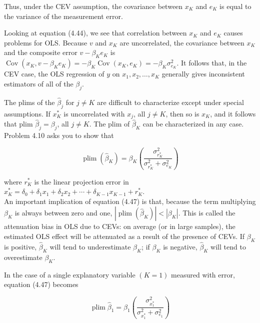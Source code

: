 \documentclass[10pt]{article}
\begin{document}
Thus, under the CEV assumption, the covariance between $x_{K}$ and $e_{K}$ is equal to the variance of the measurement error.

Looking at equation (4.44), we see that correlation between $x_{K}$ and $e_{K}$ causes problems for OLS. Because $v$ and $x_{K}$ are uncorrelated, the covariance between $x_{K}$ and the composite error $v-\beta_{K} e_{K}$ is $\operatorname{Cov}\left(x_{K}, v-\beta_{K} e_{K}\right)=-\beta_{K} \operatorname{Cov}\left(x_{K}, e_{K}\right)= -\beta_{K} \sigma_{e_{K}}^{2}$. It follows that, in the CEV case, the OLS regression of $y$ on $x_{1}, x_{2}, \ldots, x_{K}$ generally gives inconsistent estimators of all of the $\beta_{j}$.

The plims of the $\hat{\beta}_{j}$ for $j \neq K$ are difficult to characterize except under special assumptions. If $x_{K}^{*}$ is uncorrelated with $x_{j}$, all $j \neq K$, then so is $x_{K}$, and it follows that plim $\hat{\beta}_{j}=\beta_{j}$, all $j \neq K$. The plim of $\hat{\beta}_{K}$ can be characterized in any case. Problem 4.10 asks you to show that


\begin{equation*}
\operatorname{plim}\left(\hat{\beta}_{K}\right)=\beta_{K}\left(\frac{\sigma_{r_{K}^{*}}^{2}}{\sigma_{r_{K}^{*}}^{2}+\sigma_{e_{K}}^{2}}\right) \tag{4.47}
\end{equation*}


where $r_{K}^{*}$ is the linear projection error in\\
$x_{K}^{*}=\delta_{0}+\delta_{1} x_{1}+\delta_{2} x_{2}+\cdots+\delta_{K-1} x_{K-1}+r_{K}^{*}$.\\
An important implication of equation (4.47) is that, because the term multiplying $\beta_{K}$ is always between zero and one, $\left|\operatorname{plim}\left(\hat{\beta}_{K}\right)\right|<\left|\beta_{K}\right|$. This is called the attenuation bias in OLS due to CEVs: on average (or in large samples), the estimated OLS effect will be attenuated as a result of the presence of CEVs. If $\beta_{K}$ is positive, $\hat{\beta}_{K}$ will tend to underestimate $\beta_{K}$; if $\beta_{K}$ is negative, $\hat{\beta}_{K}$ will tend to overestimate $\beta_{K}$.

In the case of a single explanatory variable $(K=1)$ measured with error, equation (4.47) becomes


\begin{equation*}
\operatorname{plim} \hat{\beta}_{1}=\beta_{1}\left(\frac{\sigma_{x_{1}^{*}}^{2}}{\sigma_{x_{1}^{*}}^{2}+\sigma_{e_{1}}^{2}}\right) \tag{4.48}
\end{equation*}
\end{document}
